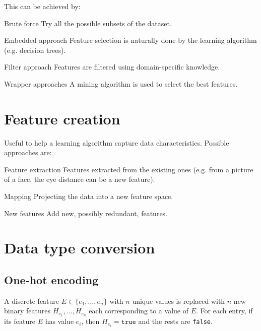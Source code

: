     This can be achieved by:
    \begin{descriptionlist}
        \item[Brute force] 
            Try all the possible subsets of the dataset.

        \item[Embedded approach]
            Feature selection is naturally done by the learning algorithm (e.g. decision trees).

        \item[Filter approach]  
            Features are filtered using domain-specific knowledge.

        \item[Wrapper approaches]  
            A mining algorithm is used to select the best features.
    \end{descriptionlist}




\section{Feature creation}
Useful to help a learning algorithm capture data characteristics.
Possible approaches are:
\begin{descriptionlist}
    \item[Feature extraction] 
        Features extracted from the existing ones (e.g. from a picture of a face, the eye distance can be a new feature).

    \item[Mapping] 
        Projecting the data into a new feature space.

    \item[New features] 
        Add new, possibly redundant, features.
\end{descriptionlist}



\section{Data type conversion}

\subsection{One-hot encoding} 
    A discrete feature $E \in \{ e_1, \dots, e_n \}$ with $n$ unique values is replaced with 
    $n$ new binary features $H_{e_1}, \dots, H_{e_n}$ each corresponding to a value of $E$.
    For each entry, if its feature $E$ has value $e_i$, then $H_{e_i} = \texttt{true}$ and the rests are \texttt{false}.

